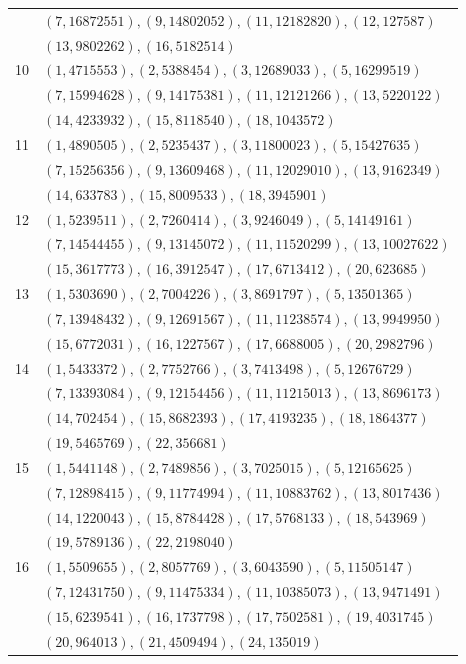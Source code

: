 \begin{longtable}{r p{}}
 & $(7,16872551), (9,14802052), (11,12182820), (12,127587)$ \\[2pt]
 & $(13,9802262), (16,5182514)$ \\[2pt]
10 & $(1,4715553), (2,5388454), (3,12689033), (5,16299519)$ \\[2pt]
 & $(7,15994628), (9,14175381), (11,12121266), (13,5220122)$ \\[2pt]
 & $(14,4233932), (15,8118540), (18,1043572)$ \\[2pt]
11 & $(1,4890505), (2,5235437), (3,11800023), (5,15427635)$ \\[2pt]
 & $(7,15256356), (9,13609468), (11,12029010), (13,9162349)$ \\[2pt]
 & $(14,633783), (15,8009533), (18,3945901)$ \\[2pt]
12 & $(1,5239511), (2,7260414), (3,9246049), (5,14149161)$ \\[2pt]
 & $(7,14544455), (9,13145072), (11,11520299), (13,10027622)$ \\[2pt]
 & $(15,3617773), (16,3912547), (17,6713412), (20,623685)$ \\[2pt]
13 & $(1,5303690), (2,7004226), (3,8691797), (5,13501365)$ \\[2pt]
 & $(7,13948432), (9,12691567), (11,11238574), (13,9949950)$ \\[2pt]
 & $(15,6772031), (16,1227567), (17,6688005), (20,2982796)$ \\[2pt]
14 & $(1,5433372), (2,7752766), (3,7413498), (5,12676729)$ \\[2pt]
 & $(7,13393084), (9,12154456), (11,11215013), (13,8696173)$ \\[2pt]
 & $(14,702454), (15,8682393), (17,4193235), (18,1864377)$ \\[2pt]
 & $(19,5465769), (22,356681)$ \\[2pt]
15 & $(1,5441148), (2,7489856), (3,7025015), (5,12165625)$ \\[2pt]
 & $(7,12898415), (9,11774994), (11,10883762), (13,8017436)$ \\[2pt]
 & $(14,1220043), (15,8784428), (17,5768133), (18,543969)$ \\[2pt]
 & $(19,5789136), (22,2198040)$ \\[2pt]
16 & $(1,5509655), (2,8057769), (3,6043590), (5,11505147)$ \\[2pt]
 & $(7,12431750), (9,11475334), (11,10385073), (13,9471491)$ \\[2pt]
 & $(15,6239541), (16,1737798), (17,7502581), (19,4031745)$ \\[2pt]
 & $(20,964013), (21,4509494), (24,135019)$ \\[2pt]

\end{longtable}
